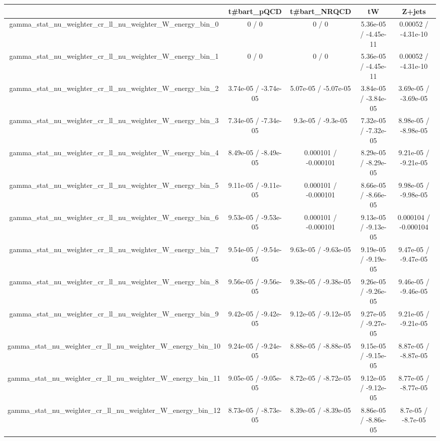 \documentclass[10pt]{article}
\begin{document}
\begin{table}[htbp]
\begin{center}
\begin{tabular}{|c|c|c|c|c|}
\hline 
      & t#bar{t}_{pQCD}      & t#bar{t}_{NRQCD}      & tW      & Z+jets \\ 
\hline 
  gamma_stat_nu_weighter_cr_ll_nu_weighter_W_energy_bin_0 & 0 / 0 & 0 / 0 & 5.36e-05 / -4.45e-11 & 0.00052 / -4.31e-10 \\ 
  gamma_stat_nu_weighter_cr_ll_nu_weighter_W_energy_bin_1 & 0 / 0 & 0 / 0 & 5.36e-05 / -4.45e-11 & 0.00052 / -4.31e-10 \\ 
  gamma_stat_nu_weighter_cr_ll_nu_weighter_W_energy_bin_2 & 3.74e-05 / -3.74e-05 & 5.07e-05 / -5.07e-05 & 3.84e-05 / -3.84e-05 & 3.69e-05 / -3.69e-05 \\ 
  gamma_stat_nu_weighter_cr_ll_nu_weighter_W_energy_bin_3 & 7.34e-05 / -7.34e-05 & 9.3e-05 / -9.3e-05 & 7.32e-05 / -7.32e-05 & 8.98e-05 / -8.98e-05 \\ 
  gamma_stat_nu_weighter_cr_ll_nu_weighter_W_energy_bin_4 & 8.49e-05 / -8.49e-05 & 0.000101 / -0.000101 & 8.29e-05 / -8.29e-05 & 9.21e-05 / -9.21e-05 \\ 
  gamma_stat_nu_weighter_cr_ll_nu_weighter_W_energy_bin_5 & 9.11e-05 / -9.11e-05 & 0.000101 / -0.000101 & 8.66e-05 / -8.66e-05 & 9.98e-05 / -9.98e-05 \\ 
  gamma_stat_nu_weighter_cr_ll_nu_weighter_W_energy_bin_6 & 9.53e-05 / -9.53e-05 & 0.000101 / -0.000101 & 9.13e-05 / -9.13e-05 & 0.000104 / -0.000104 \\ 
  gamma_stat_nu_weighter_cr_ll_nu_weighter_W_energy_bin_7 & 9.54e-05 / -9.54e-05 & 9.63e-05 / -9.63e-05 & 9.19e-05 / -9.19e-05 & 9.47e-05 / -9.47e-05 \\ 
  gamma_stat_nu_weighter_cr_ll_nu_weighter_W_energy_bin_8 & 9.56e-05 / -9.56e-05 & 9.38e-05 / -9.38e-05 & 9.26e-05 / -9.26e-05 & 9.46e-05 / -9.46e-05 \\ 
  gamma_stat_nu_weighter_cr_ll_nu_weighter_W_energy_bin_9 & 9.42e-05 / -9.42e-05 & 9.12e-05 / -9.12e-05 & 9.27e-05 / -9.27e-05 & 9.21e-05 / -9.21e-05 \\ 
  gamma_stat_nu_weighter_cr_ll_nu_weighter_W_energy_bin_10 & 9.24e-05 / -9.24e-05 & 8.88e-05 / -8.88e-05 & 9.15e-05 / -9.15e-05 & 8.87e-05 / -8.87e-05 \\ 
  gamma_stat_nu_weighter_cr_ll_nu_weighter_W_energy_bin_11 & 9.05e-05 / -9.05e-05 & 8.72e-05 / -8.72e-05 & 9.12e-05 / -9.12e-05 & 8.77e-05 / -8.77e-05 \\ 
  gamma_stat_nu_weighter_cr_ll_nu_weighter_W_energy_bin_12 & 8.73e-05 / -8.73e-05 & 8.39e-05 / -8.39e-05 & 8.86e-05 / -8.86e-05 & 8.7e-05 / -8.7e-05 \\ 

\end{tabular}
\end{center}
\end{table}
\end{document}
